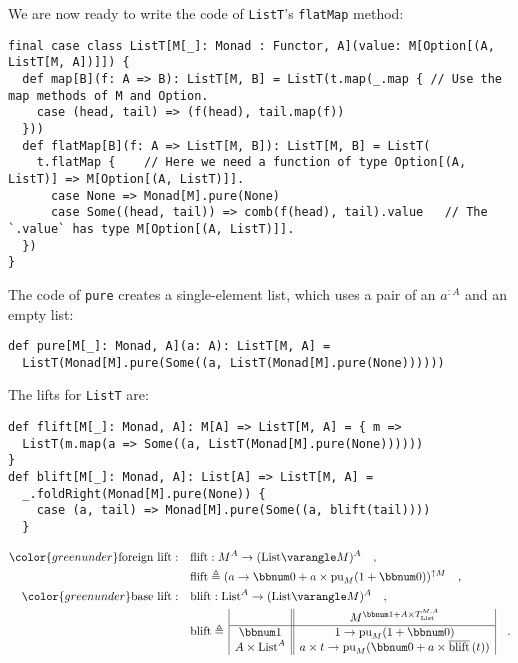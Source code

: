 We are now ready to write the code of \lstinline!ListT!\textsf{'}s \lstinline!flatMap!
method:
\begin{lstlisting}
final case class ListT[M[_]: Monad : Functor, A](value: M[Option[(A, ListT[M, A])]]) {
  def map[B](f: A => B): ListT[M, B] = ListT(t.map(_.map { // Use the map methods of M and Option.
    case (head, tail) => (f(head), tail.map(f))
  }))
  def flatMap[B](f: A => ListT[M, B]): ListT[M, B] = ListT(
    t.flatMap {    // Here we need a function of type Option[(A, ListT)] => M[Option[(A, ListT)]].
      case None => Monad[M].pure(None)
      case Some((head, tail)) => comb(f(head), tail).value   // The `.value` has type M[Option[(A, ListT)]].
  })
}
\end{lstlisting}
The code of \lstinline!pure! creates a single-element list, which
uses a pair of an $a^{:A}$ and an empty list:
\begin{lstlisting}
def pure[M[_]: Monad, A](a: A): ListT[M, A] =
  ListT(Monad[M].pure(Some((a, ListT(Monad[M].pure(None))))))
\end{lstlisting}
The lifts for \lstinline!ListT! are:
\begin{lstlisting}
def flift[M[_]: Monad, A]: M[A] => ListT[M, A] = { m =>
  ListT(m.map(a => Some((a, ListT(Monad[M].pure(None))))))
}
def blift[M[_]: Monad, A]: List[A] => ListT[M, A] =
  _.foldRight(Monad[M].pure(None)) {
    case (a, tail) => Monad[M].pure(Some((a, blift(tail))))
  }
\end{lstlisting}
\begin{align*}
{\color{greenunder}\text{foreign lift}:}\quad & \text{flift}:M^{A}\rightarrow(\text{List}\varangle M)^{A}\quad,\\
 & \text{flift}\triangleq(a\rightarrow\bbnum 0+a\times\text{pu}_{M}(1+\bbnum 0))^{\uparrow M}\quad,\\
{\color{greenunder}\text{base lift}:}\quad & \text{blift}:\text{List}^{A}\rightarrow(\text{List}\varangle M)^{A}\quad,\\
 & \text{blift}\triangleq\,\begin{array}{|c||c|}
 & M^{\bbnum 1+A\times T_{\text{List}}^{M,A}}\\
\hline \bbnum 1 & 1\rightarrow\text{pu}_{M}(1+\bbnum 0)\\
A\times\text{List}^{A} & a\times t\rightarrow\text{pu}_{M}(\bbnum 0+a\times\overline{\text{blift}}\,(t))
\end{array}\quad.
\end{align*}

